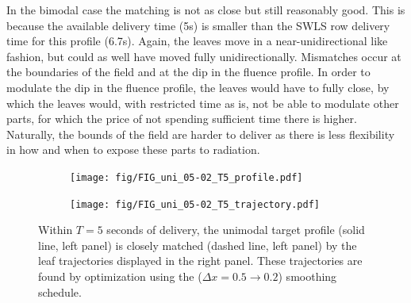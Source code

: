\documentclass{iopart}
\begin{document}
In the bimodal case the matching is not as close but still reasonably good. This is because the available delivery time (5s) is smaller than the SWLS row delivery time for this profile (6.7s).
Again, the leaves move in a near-unidirectional like fashion, but could as well have moved fully unidirectionally. 
Mismatches occur at the boundaries of the field and at the dip in the fluence profile.
In order to modulate the dip in the fluence profile, the leaves would have to fully close, by which the leaves would, with restricted time as is, not be able to modulate other parts, for which the price of not spending sufficient time there is higher.
Naturally, the bounds of the field are harder to deliver as there is less flexibility in how and when to expose these parts to radiation. %

\begin{figure}[h]
  \centering
  \begin{subfigure}[b]{0.5\linewidth}
    \centering\texttt{[image: fig/FIG\_uni\_05-02\_T5\_profile.pdf]}
    \caption{\label{fig:sps_umt_prof}}
  \end{subfigure}%
  \begin{subfigure}[b]{0.5\linewidth}
    \centering\texttt{[image: fig/FIG\_uni\_05-02\_T5\_trajectory.pdf]}
    \caption{\label{fig:sps_umt_traj}}
  \end{subfigure}
  \caption{Within $T=5$ seconds of delivery, the unimodal target profile (solid line, left panel) is closely matched (dashed line, left panel) by the leaf trajectories displayed in the right panel. These trajectories are found by optimization using the ($\Delta x = 0.5 \to 0.2$) smoothing schedule.}
  \label{fig:smoothingParamSweep_unimodalTraj}
\end{figure}

\end{document}
